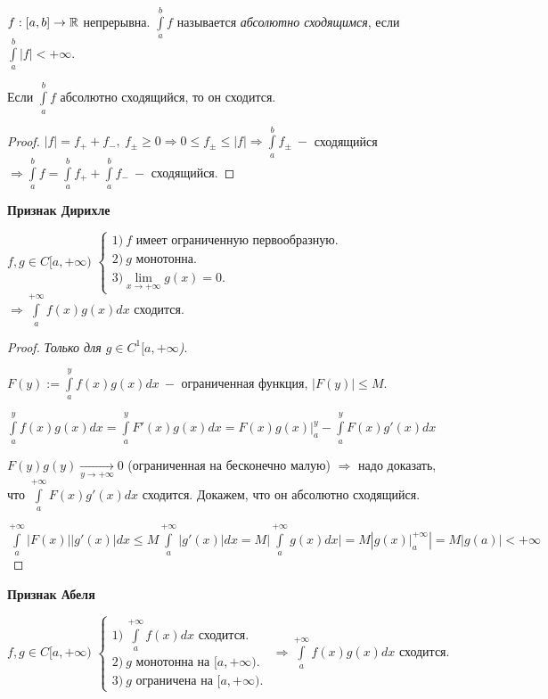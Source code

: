 

\begin{definition}
    $f:[a, b]\rightarrow \mathbb{R}$ непрерывна. $\int\limits_a^b f$ называется \textit{абсолютно сходящимся}, если $\int\limits_a^b |f|<+\infty$.
\end{definition}

\begin{theorem}
    Если $\int\limits_a^b f$ абсолютно сходящийся, то он сходится.
\end{theorem}

\begin{proof}
    $|f|=f_++f_-,\ f_\pm \geq 0\Rightarrow 0\leq f_\pm\leq |f|\Rightarrow \int\limits_a^b f_\pm\ -$ сходящийся $\Rightarrow \int\limits_a^b f=\int\limits_a^b f_++\int\limits_a^b f_-\ -$ сходящийся.
\end{proof}

\begin{theorem}
    \textbf{Признак Дирихле}

    $f, g\in C[a,+\infty)$
    $\begin{cases} 1)\ f\text{ имеет ограниченную первообразную.} \\
        2)\ g\text{  монотонна.} \\
        3)\lim\limits_{x\rightarrow +\infty} g(x)=0.
    \end{cases}$ $\Rightarrow \int\limits_a^{+\infty} f(x)g(x)dx$ сходится.
\end{theorem}

\begin{proof}
    \textit{Только для $g\in C^1[a,+\infty$)}.

    $F(y):=\int\limits_a^y f(x)g(x)dx\ -$ ограниченная функция, $|F(y)|\leq M$.

    $\int\limits_a^y f(x)g(x)dx = \int\limits_a^y F'(x)g(x)dx = \left.F(x)g(x)\right|_a^y -\int\limits_a^{y}F(x)g'(x)dx$

    $F(y)g(y)\underset{y\rightarrow +\infty}{\rightarrow} 0$ (ограниченная на бесконечно малую) $\Rightarrow$ надо доказать, что $\int\limits_a^{+\infty}F(x)g'(x)dx$ сходится. Докажем, что он абсолютно сходящийся.

    $\int\limits_a^{+\infty}|F(x)||g'(x)|dx\leq M\int\limits_a^{+\infty}|g'(x)|dx=M\bigg|\int\limits_a^{+\infty}g(x)dx\bigg|=M|\left.g(x)\right|_a^{+\infty}|=M|g(a)|<+\infty$
\end{proof}

\begin{theorem}
    \textbf{Признак Абеля}

    $f, g\in C[a,+\infty)$
    $\begin{cases}
        1)\ \int\limits_a^{+\infty} f(x)dx\text{ сходится.} \\
        2)\ g\text{  монотонна на } [a, +\infty).  \\
        3)\ g\text{  ограничена на } [a, +\infty).
    \end{cases}$ $\Rightarrow \int\limits_a^{+\infty} f(x)g(x)dx$ сходится.
\end{theorem}

